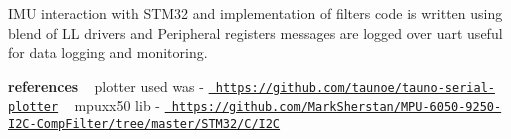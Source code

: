 IMU interaction with STM32 and implementation of filters code is written using blend of LL drivers and Peripheral registers messages are logged over uart useful for data logging and monitoring.

{\bfseries{references}} ~\newline
 plotter used was -\/ \href{https://github.com/taunoe/tauno-serial-plotter}{\texttt{ https\+://github.\+com/taunoe/tauno-\/serial-\/plotter}} ~\newline
 mpuxx50 lib -\/ \href{https://github.com/MarkSherstan/MPU-6050-9250-I2C-CompFilter/tree/master/STM32/C/I2C}{\texttt{ https\+://github.\+com/\+Mark\+Sherstan/\+MPU-\/6050-\/9250-\/\+I2\+C-\/\+Comp\+Filter/tree/master/\+STM32/\+C/\+I2C}} 